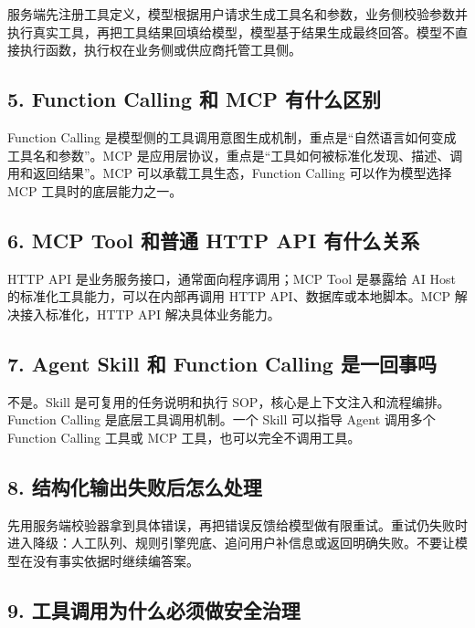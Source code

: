 \documentclass[10pt,a4paper]{ctexart}
\begin{document}
服务端先注册工具定义，模型根据用户请求生成工具名和参数，业务侧校验参数并执行真实工具，再把工具结果回填给模型，模型基于结果生成最终回答。模型不直接执行函数，执行权在业务侧或供应商托管工具侧。



\subsection{5. Function Calling 和 MCP 有什么区别}


Function Calling 是模型侧的工具调用意图生成机制，重点是“自然语言如何变成工具名和参数”。MCP 是应用层协议，重点是“工具如何被标准化发现、描述、调用和返回结果”。MCP 可以承载工具生态，Function Calling 可以作为模型选择 MCP 工具时的底层能力之一。



\subsection{6. MCP Tool 和普通 HTTP API 有什么关系}


HTTP API 是业务服务接口，通常面向程序调用；MCP Tool 是暴露给 AI Host 的标准化工具能力，可以在内部再调用 HTTP API、数据库或本地脚本。MCP 解决接入标准化，HTTP API 解决具体业务能力。



\subsection{7. Agent Skill 和 Function Calling 是一回事吗}


不是。Skill 是可复用的任务说明和执行 SOP，核心是上下文注入和流程编排。Function Calling 是底层工具调用机制。一个 Skill 可以指导 Agent 调用多个 Function Calling 工具或 MCP 工具，也可以完全不调用工具。



\subsection{8. 结构化输出失败后怎么处理}


先用服务端校验器拿到具体错误，再把错误反馈给模型做有限重试。重试仍失败时进入降级：人工队列、规则引擎兜底、追问用户补信息或返回明确失败。不要让模型在没有事实依据时继续编答案。



\subsection{9. 工具调用为什么必须做安全治理}
\end{document}
